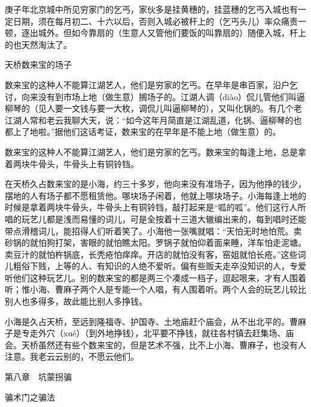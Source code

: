 \documentclass[12pt,UTF8]{ctexbook}
\begin{document}
庚子年北京城中所见穷家门的乞丐，家伙多是挂黄穗的，挂蓝穗的乞丐入城也有一定日期，须在每月初二、十六以后，否则入城必被杆上的（乞丐头儿）率众痛责一顿，逐出城外。但如今靠扇的（生意人又管他们要饭的叫靠扇的）随便入城，杆上的也天然淘汰了。





天桥数来宝的场子


数来宝的这种人不能算江湖艺人，他们是穷家的乞丐。在早年是串百家，沿户乞讨，向来没有到市场上地（做生意）搁场子的。江湖人调（diào）侃儿管他们叫逼柳琴的（见人要一文钱与要一大枚，调侃儿叫逼柳琴的），又叫化锅的。有几个老江湖人常和老云我聊大天，说：“如今这年月简直是江湖乱道，化锅、逼柳琴的也都上了地啦。”据他们这话考证，数来宝的在早年是不能上地（做生意）的。

数来宝的这种人不能算江湖艺人，他们是穷家的乞丐。数来宝的每逢上地，总是拿着两块牛骨头，牛骨头上有铜铃铛。



在天桥久占数来宝的是小海，约三十多岁，他向来没有准场子，因为他挣的钱少，摆地的人有场子都不愿租赁他。哪块场子闲着，他就上哪块场子。小海每逢上地的时候是拿着两块牛骨头，牛骨头上有铜铃铛，敲打起来是“呱的呱”。他们这行人所唱的玩艺儿都是浅而易懂的词儿，可是全按着十三道大辙编出来的，每到唱时还能带点滑稽词儿，能招得人们听着笑了。小海他一张嘴就唱：“天怕无时地怕荒。卖砂锅的就怕狗打架，害眼的就怕瞧太阳。罗锅子就怕仰着面来睡，洋车怕走泥塘。卖豆汁的就怕杵锅底，长秃疮怕痒痒。开店的就怕没有客，窑姐就怕长疮。”这些词儿粗俗下贱，上等的人、有知识的人绝不爱听。偏有些贩夫走卒没知识的人，专爱听他们这种玩艺儿。别的数来宝的都是两三个凑成一档子，逗起哏来，才有人围着听；惟小海、曹麻子两个人是专能一个人唱，有人围着听。两个人会的玩艺儿较比别人也多得多，故此能比别人多挣钱。

小海是久占天桥，至远到隆福寺、护国寺、土地庙赶个庙会，从不出北平的。曹麻子是专走外穴（xué）（到外地挣钱），北平要不挣钱，就往各村镇去赶集场、庙会。天桥虽然还有些个数来宝的，但是艺术不强，比不上小海、曹麻子，也没有人注意。我老云云别的，不愿云他们。





第八章　坑蒙拐骗


骗术门之骗法
\end{document}

